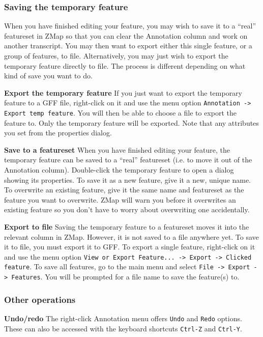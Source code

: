 \documentclass[letterpaper]{article}
\begin{document}
\subsubsection{Saving the temporary feature}
When you have finished editing your feature, you may wish to save it to a ``real'' featureset in ZMap so that you can clear the Annotation column and work on another transcript. You may then want to export either this single feature, or a group of features, to file. Alternatively, you may just wish to export the temporary feature directly to file. The process is different depending on what kind of save you want to do.

\textbf{Export the temporary feature}
If you just want to export the temporary feature to a GFF file, right-click on it and use the menu option \lstinline{Annotation -> Export temp feature}. You will then be able to choose a file to export the feature to. Only the temporary feature will be exported. Note that any attributes you set from the properties dialog.

\textbf{Save to a featureset}
When you have finished editing your feature, the temporary feature can be saved to a ``real'' featureset (i.e. to move it out of the Annotation column). Double-click the temporary feature to open a dialog showing its properties. To save it as a new feature, give it a new, unique name. To overwrite an existing feature, give it the same name and featureset as the feature you want to overwrite. ZMap will warn you before it overwrites an existing feature so you don't have to worry about overwriting one accidentally.

\textbf{Export to file}
Saving the temporary feature to a featureset moves it into the relevant column in ZMap. However, it is not saved to a file anywhere yet. To save it to file, you must export it to GFF. To export a single feature, right-click on it and use the menu option \lstinline{View or Export Feature... -> Export -> Clicked feature}. To save all features, go to the main menu and select \lstinline{File -> Export -> Features}. You will be prompted for a file name to save the feature(s) to.

\subsubsection{Other operations} \label{sec_annotation_undo}
\textbf{Undo/redo}
The right-click Annotation menu offers \lstinline{Undo} and \lstinline{Redo} options. These can also be accessed with the keyboard shortcuts \lstinline{Ctrl-Z} and \lstinline{Ctrl-Y}.
\end{document}

